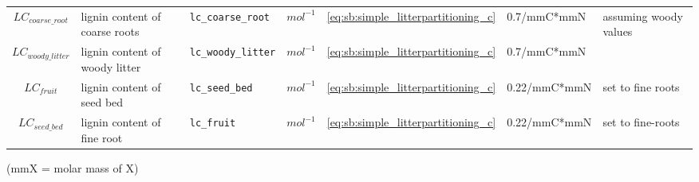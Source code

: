 \begin{table}
\begin{tabularx}{\linewidth}{|c|X|l|l|c|l|X|}
$LC_{coarse\_root}$ & lignin content of coarse roots & \texttt{lc\_coarse\_root} & $mol^{-1}$ &  \ref{eq:sb:simple_litterpartitioning_c} & 0.7/mmC*mmN & assuming woody values\\
$LC_{woody\_litter}$ & lignin content of woody litter & \texttt{lc\_woody\_litter} & $mol^{-1}$ &  \ref{eq:sb:simple_litterpartitioning_c} & 0.7/mmC*mmN & \cite{White:2000vl}\\
$LC_{fruit}$ & lignin content of seed bed & \texttt{lc\_seed\_bed} & $mol^{-1}$ & \ref{eq:sb:simple_litterpartitioning_c} & 0.22/mmC*mmN & set to fine roots\\
$LC_{seed\_bed}$ & lignin content of fine root & \texttt{lc\_fruit} & $mol^{-1}$ & \ref{eq:sb:simple_litterpartitioning_c} & 0.22/mmC*mmN & set to fine-roots\\
\hline 
\end{tabularx}
(mmX = molar mass of X)
\end{table}


